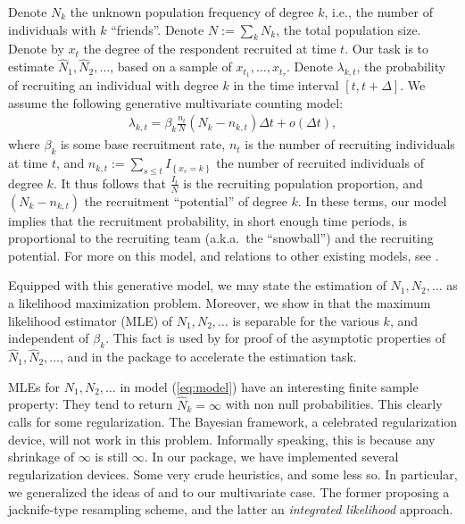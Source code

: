 \documentclass[article]{jss}
\newcommand{\set}[1]{\left\{ #1 \right\}}
\newcommand{\smallO}{o}
\newcommand{\aka}{{a.k.a.\ }}
\newcommand{\Ns}{N_1,N_2,\dots}
\newcommand{\hatNs}{\hat{N}_1, \hat{N}_2,\dots}
\begin{document}
Denote $N_k$ the unknown population frequency of degree $k$, i.e., the number of individuals with $k$ ``friends''. 
Denote $N:=\sum_k N_k$, the total population size. 
Denote by $x_t$ the degree of the respondent recruited at time $t$. 
Our task is to estimate $\hat{N}_1, \hat{N}_2,\dots$, based on a sample of $x_{t_1},\dots, x_{t_\tau}$. 
Denote $\lambda_{k,t}$, the probability of recruiting an individual with degree $k$ in the time interval $[t,t+\Delta]$.
We assume the following generative multivariate counting model:
\begin{align}
\label{eq:model}
 \lambda_{k,t} =  \beta_k \frac{n_t}{N}  (N_k - n_{k,t}) \Delta t + \smallO(\Delta t),
\end{align}
where $\beta_k$ is some base recruitment rate, 
$n_t$ is the number of recruiting individuals at time $t$, 
and $n_{k,t}:=\sum_{s\leq t} I_{\set{x_s=k}}$ the number of recruited individuals of degree $k$. 
It thus follows that $\frac{I_t}{N}$ is the recruiting population proportion, and $(N_k - n_{k,t})$ the recruitment ``potential'' of degree $k$.
In these terms, our model implies that the recruitment probability, in short enough time periods, is proportional to the recruiting team (\aka the ``snowball'') and the recruiting potential. 
For more on this model, and relations to other existing models, see \citet{berchenko_modeling_2013}.

Equipped with this generative model, we may state the estimation of $\Ns$ as a likelihood maximization problem. 
Moreover, we show in \cite{berchenko_modeling_2013} that the maximum likelihood estimator (MLE) of $\Ns$ is separable for the various $k$, and independent of $\beta_k$. 
This fact is used by \citet{berchenko_modeling_2013} for proof of the asymptotic properties of $\hatNs$, and in the   package to accelerate the estimation task.

MLEs for $\Ns$ in model (\ref{eq:model}) have an interesting finite sample property: They tend to return $\hat{N}_k=\infty$ with non null probabilities. 
This clearly calls for some regularization. 
The Bayesian framework, a celebrated regularization device, will not work in this problem. 
Informally speaking, this is because any shrinkage of $\infty$ is still $\infty$. 
In our package, we have implemented several regularization devices. Some very crude heuristics, and some less so. 
In particular, we generalized the ideas of \cite{musa_estimating_1991} and \cite{osborne_inference_2000} to our multivariate case.
The former proposing a jacknife-type resampling scheme, and the latter an \emph{integrated likelihood} approach.
\end{document}
